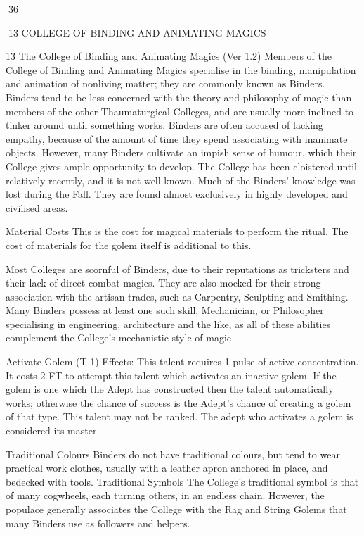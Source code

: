 \documentclass[a4paper]{article}
\begin{document}
\begin{multicols}{3}
36

13 COLLEGE OF BINDING AND ANIMATING MAGICS

13 The College of Binding and Animating Magics (Ver 1.2)
Members of the College of Binding and Animating
Magics specialise in the binding, manipulation and
animation of nonliving matter; they are commonly
known as Binders. Binders tend to be less concerned with the theory and philosophy of magic
than members of the other Thaumaturgical Colleges, and are usually more inclined to tinker
around until something works. Binders are often
accused of lacking empathy, because of the amount
of time they spend associating with inanimate
objects. However, many Binders cultivate an impish sense of humour, which their College gives
ample opportunity to develop. The College has
been cloistered until relatively recently, and it is
not well known. Much of the Binders’ knowledge
was lost during the Fall. They are found almost
exclusively in highly developed and civilised areas.

Material Costs This is the cost for magical materials to perform the ritual. The cost of materials for
the golem itself is additional to this.

Most Colleges are scornful of Binders, due to their
reputations as tricksters and their lack of direct
combat magics. They are also mocked for their
strong association with the artisan trades, such as
Carpentry, Sculpting and Smithing. Many Binders
possess at least one such skill, Mechanician, or
Philosopher specialising in engineering, architecture and the like, as all of these abilities complement the College’s mechanistic style of magic

Activate Golem (T-1)
Effects: This talent requires 1 pulse of active concentration. It costs 2 FT to attempt this talent which
activates an inactive golem. If the golem is one
which the Adept has constructed then the talent
automatically works; otherwise the chance of success is the Adept’s chance of creating a golem of
that type. This talent may not be ranked. The adept
who activates a golem is considered its master.

Traditional Colours
Binders do not have traditional colours, but tend to
wear practical work clothes, usually with a leather
apron anchored in place, and bedecked with tools.
Traditional Symbols
The College’s traditional symbol is that of many
cogwheels, each turning others, in an endless
chain. However, the populace generally associates
the College with the Rag and String Golems that
many Binders use as followers and helpers.


\end{multicols}
\end{document}
